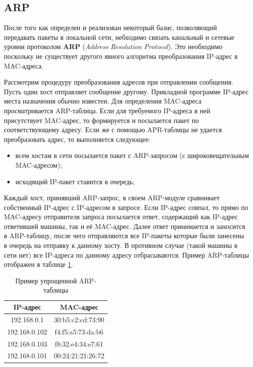 {\small{}}

\subsection{ARP}

После того как определен и реализован некоторый базис, позволяющий передавать пакеты в локальной сети, небходимо связать канальный и сетевые уровни протоколом \textbf{ARP} (\textit{Address Resolution Protocol})\cite{arp}. Это необходимо поскольку не существует другого явного алгоритма преобразования IP-адрес в MAC-адреса\cite{arpcitforum}.

Рассмотрим процедуру преобразования адресов при отправлении сообщения. Пусть один хост отправляет сообщение другому. Прикладной программе IP-адрес места назначения обычно известен. Для определения MAC-адреса просматривается ARP-таблица. Если для требуемого IP-адреса в ней присутствует MAC-адрес, то формируется и посылается пакет по соответствующему адресу. Если же с помощью APR-таблицы не удается преобразовать адрес, то выполняется следующее:
\begin{itemize}
	\item всем хостам в сети посылается пакет с ARP-запросом (с широковещательным MAC-адресом);
	\item исходящий IP-пакет ставится в очередь;
\end{itemize}

Каждый хост, принявший ARP-запрос, в своем ARP-модуле сравнивает собственный IP-адрес с IP-адресом в запросе. Если IP-адрес совпал, то прямо по MAC-адресу отправителя запроса посылается ответ, содержащий как IP-адрес ответившей машины, так и её MAC-адрес. Далее ответ принимается и заносится в ARP-таблицу, после чего отправляются все IP-пакеты которые были занесены в очередь на отправку к данному хосту. В противном случае (такой машины в сети нет) все IP-адреса по данному адресу отбрасываются. Пример ARP-таблицы отображен в таблице \ref{arptable}.

\begin{table}[h!]
\caption{Пример упрощенной ARP-таблицы}
\label{arptable}
	\begin{tabular}{|c|c|}
	\hline
	IP-адрес & MAC-адрес\\
	\hline
	192.168.0.1 & 30:b5:c2:cd:73:90 \\
	\hline
	192.168.0.102 & f4:f5:a5:73:da:b6 \\
	\hline
	192.168.0.103 & f8:32:e4:34:e7:61 \\
	\hline
	192.168.0.101 & 00:24:21:21:26:72 \\
	\hline
	\end{tabular}
\end{table}

